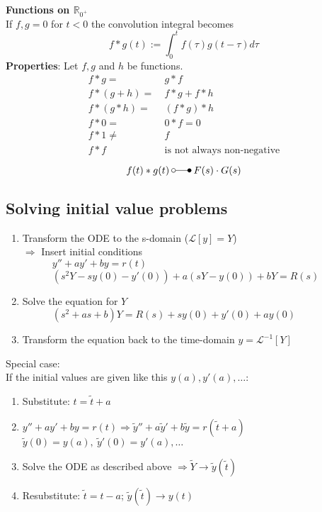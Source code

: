 \textbf{Functions on $\mathbb{R}_{0^+}$}\\
If $f,g=0$ for $t<0$ the convolution integral becomes
\begin{equation*}
    f*g(t):=\int_{0}^{t}f(\tau)g(t-\tau)d\tau
\end{equation*}
\textbf{Properties}: Let $f,g$ and $h$ be functions.
\begin{align*}
    f*g =     & \ g*f                               \\
    f*(g+h) = & \ f*g+f*h                           \\
    f*(g*h) = & \ (f*g)*h                           \\
    f*0 =     & \ 0*f=0                             \\
    f*1 \ne   & \ f                                 \\
    f*f \;    & \ \text{is not always non-negative}
\end{align*}
\begin{equation*}
    f(t)*g(t) \:\laplace\: F(s)\cdot G(s)
\end{equation*}

\subsection{Solving initial value problems}
\begin{enumerate}
    \item Transform the ODE to the s-domain ($\mathcal{L}[y]=Y$)\\
          $\Rightarrow$ Insert initial conditions\\
          $\quad\qquad y''+ay'+by=r(t)$\\
          $\quad\qquad(s^2Y-sy(0)-y'(0))+a(sY-y(0))+bY=R(s)$
    \item Solve the equation for $Y$ \\
          $\quad\qquad (s^2+as+b)Y=R(s)+sy(0)+y'(0)+ay(0)$
    \item Transform the equation back to the time-domain $y=\mathcal{L}^{-1}[Y]$
\end{enumerate}
Special case:\\
If the initial values are given like this $y(a),y'(a),\dots$:
\begin{enumerate}[label=\alph*]
    \item Substitute: $t=\tilde{t}+a$
    \item $y''+ay'+by=r(t) \Rightarrow \tilde{y}''+a\tilde{y}'+b\tilde{y}=r(\tilde{t}+a)$\\
          $\tilde{y}(0)=y(a),\:\tilde{y}'(0)=y'(a),\dots$
    \item Solve the ODE as described above $\Rightarrow \tilde{Y} \rightarrow \tilde{y}(\tilde{t})$
    \item Resubstitute: $\tilde{t}=t-a$; $\tilde{y}(\tilde{t})\rightarrow y(t)$
\end{enumerate}